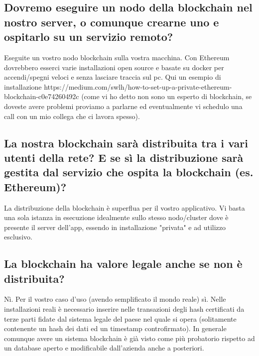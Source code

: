 \subsection*{Dovremo eseguire un nodo della blockchain nel nostro server, o comunque crearne uno e ospitarlo su un servizio remoto?}
Eseguite un vostro nodo blockchain sulla vostra macchina. Con Ethereum dovrebbero esserci varie installazioni open source e basate su docker per accendi/spegni veloci e senza lasciare traccia sul pc. Qui un esempio di installazione https://medium.com/swlh/how-to-set-up-a-private-ethereum-blockchain-c0e74260492c (come vi ho detto non sono un esperto di blockchain, se doveste avere problemi proviamo a parlarne ed eventualmente vi schedulo una call con un mio collega che ci lavora spesso).
\subsection*{La nostra blockchain sarà distribuita tra i vari utenti della rete? E se sì la distribuzione sarà gestita dal servizio che ospita la blockchain (es. Ethereum)?  }
La distribuzione della blockchain è superflua per il vostro applicativo. Vi basta una sola istanza in esecuzione idealmente sullo stesso nodo/cluster dove è presente il server dell'app, essendo in installazione "privata" e ad utilizzo esclusivo.
\subsection*{La blockchain ha valore legale anche se non è distribuita?}
Nì. Per il vostro caso d'uso (avendo semplificato il mondo reale) sì. Nelle installazioni reali è necessario inserire nelle transazioni degli hash certificati da terze parti fidate dal sistema legale del paese nel quale si opera (solitamente contenente un hash dei dati ed un timestamp controfirmato). In generale comunque avere un sistema blockchain è già visto come più probatorio rispetto ad un database aperto e modificabile dall'azienda anche a posteriori.

